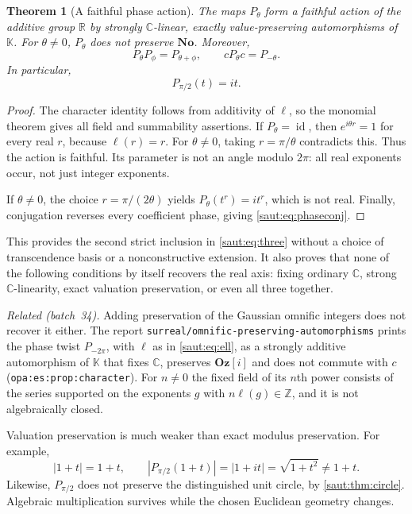 \documentclass[11pt]{article}
\newtheorem{theorem}{Theorem}[section]
\theoremstyle{definition}
\theoremstyle{remark}
\newcommand{\No}{\mathbf{No}}
\newcommand{\R}{\mathbb R}
\newcommand{\C}{\mathbb C}
\newcommand{\Z}{\mathbb Z}
\newcommand{\K}{\mathbb K}
\newcommand{\id}{\operatorname{id}}
\newcommand{\repo}[1]{\nolinkurl{#1}}%
\newcommand{\lbl}[1]{\nolinkurl{#1}}%
\newcommand{\Oz}{\mathbf{Oz}}
\numberwithin{equation}{section}
\begin{document}
\begin{theorem}[A faithful phase action]\label{saut:thm:phase}
The maps $P_\theta$ form a faithful action of the additive group $\R$ by
strongly $\C$-linear, exactly value-preserving automorphisms of $\K$.
For $\theta\ne0$, $P_\theta$ does not preserve $\No$. Moreover,
\begin{equation}\label{saut:eq:phaseconj}
 P_\theta P_\phi=P_{\theta+\phi},\qquad
 cP_\theta c=P_{-\theta}.
\end{equation}
In particular,
\[
 P_{\pi/2}(t)=it.
\]
\end{theorem}
\begin{proof}
The character identity follows from additivity of $\ell$, so the
monomial theorem gives all field and summability assertions. If
$P_\theta=\id$, then $e^{i\theta r}=1$ for every real $r$, because
$\ell(r)=r$. For $\theta\ne0$, taking $r=\pi/\theta$ contradicts this.
Thus the action is faithful. Its parameter is not an angle modulo $2\pi$:
all real exponents occur, not just integer exponents.

If $\theta\ne0$, the choice $r=\pi/(2\theta)$ yields
$P_\theta(t^r)=it^r$, which is not real. Finally, conjugation reverses every
coefficient phase, giving \eqref{saut:eq:phaseconj}.
\end{proof}

This provides the second strict inclusion in \eqref{saut:eq:three} without a
choice of transcendence basis or a nonconstructive extension. It also proves
that none of the following conditions by itself recovers the real axis:
fixing ordinary $\C$, strong $\C$-linearity, exact valuation preservation,
or even all three together.

\emph{Related (batch~34).} Adding preservation of the Gaussian omnific
integers does not recover it either. The report
\repo{surreal/omnific-preserving-automorphisms} prints the phase twist
$P_{-2\pi}$, with $\ell$ as in \eqref{saut:eq:ell}, as a strongly additive
automorphism of $\K$ that fixes $\C$, preserves $\Oz[i]$ and does not commute
with $c$ (\lbl{opa:es:prop:character}). For $n\ne0$ the fixed field of its
$n$th power consists of the series supported on the exponents $g$ with
$n\ell(g)\in\Z$, and it is not algebraically closed.

Valuation preservation is much weaker than exact modulus preservation.
For example,
\[
 |1+t|=1+t,
 \qquad |P_{\pi/2}(1+t)|=|1+it|=\sqrt{1+t^2}\ne1+t.
\]
Likewise, $P_{\pi/2}$ does not preserve the distinguished unit circle,
by \cref{saut:thm:circle}. Algebraic multiplication survives while the chosen
Euclidean geometry changes.
\end{document}
